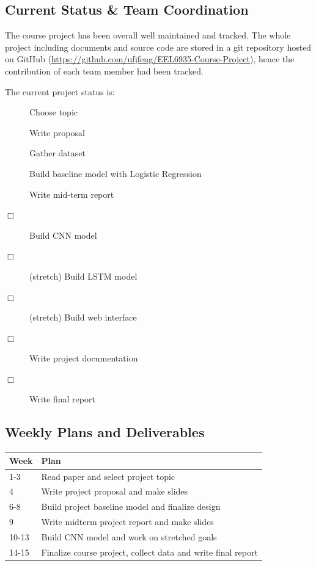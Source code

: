 \documentclass[conference]{IEEEtran}
\begin{document}
\subsection{Current Status \& Team Coordination}
\label{manage:status}
    The course project has been overall well maintained and tracked. 
    The whole project including documents and source code are stored
    in a git repository hosted on GitHub 
    (\url{https://github.com/ufjfeng/EEL6935-Course-Project}),
    hence the contribution of each team member had been tracked.
    
    The current project status is:
    \begin{description}
        \item[\CheckedBox] Choose topic
        \item[\CheckedBox] Write proposal
        \item[\CheckedBox] Gather dataset
        \item[\CheckedBox] Build baseline model with Logistic Regression
        \item[\CheckedBox] Write mid-term report 
        \item[$\Box$] Build CNN model
        \item[$\Box$] (stretch) Build LSTM model
        \item[$\Box$] (stretch) Build web interface
        \item[$\Box$] Write project documentation
        \item[$\Box$] Write final report
    \end{description}

\subsection{Weekly Plans and Deliverables}
\label{manage:plan}

    \begin{center}
        \begin{tabular}{| l | p{7cm} |}
        \hline
        Week & Plan \\ \hline
        1-3 & Read paper and select project topic \\ \hline
        4 & Write project proposal and make slides \\ \hline
        6-8 & Build project baseline model and finalize design \\ \hline
        9 & Write midterm project report and make slides \\ \hline
        10-13 & Build CNN model and work on stretched goals \\ \hline
        14-15 & Finalize course project, collect data and write final report \\ \hline
        \end{tabular}
    \end{center}
\end{document}
